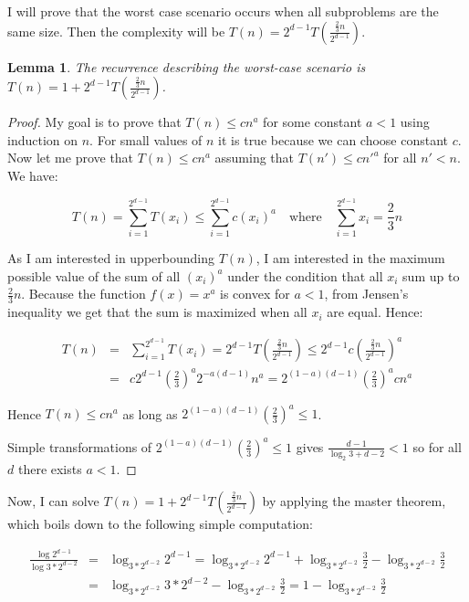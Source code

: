 \documentclass[10pt,a4paper]{article}
\newtheorem{lemma}{Lemma}
\begin{document}
I will prove that the worst case scenario occurs when all subproblems are the same size. Then the complexity will be $T(n)=2^{d-1}T(\frac{\frac{2}{3}n}{2^{d-1}})$.

\begin{lemma}\label{lem:5}
The recurrence describing the worst-case scenario is $T(n)=1+2^{d-1}T(\frac{\frac{2}{3}n}{2^{d-1}})$.
\end{lemma}

\begin{proof}

My goal is to prove that $T(n) \leq c n^a$ for some constant $a < 1$ using induction on $n$. For small values of $n$ it is true because we can choose constant $c$. Now let me prove that $T(n) \leq c n^a$ assuming that $T(n') \leq c n'^a$ for all $n'<n$. We have:

$$T(n) = \displaystyle\sum\limits_{i=1}^{2^{d-1}} T(x_i)\leq\displaystyle\sum\limits_{i=1}^{2^{d-1}} c(x_i)^{a}  \quad\text{where}\quad  \displaystyle\sum\limits_{i=1}^{2^{d-1}} x_i = \frac{2}{3}n$$ 

As I am interested in upperbounding $T(n)$, I am interested in the maximum possible value of the sum of all $(x_i)^{a}$ under the condition that all $x_{i}$ sum up to $\frac{2}{3}n$. Because the function $f(x)=x^{a}$ is convex for $a<1$, from Jensen's inequality we get that the sum is maximized when all $x_{i}$ are equal. Hence:

\begin{eqnarray*}
T(n) &=& \displaystyle\sum\limits_{i=1}^{2^{d-1}} T(x_i) = 2^{d-1} T\left(\frac{\frac{2}{3}n}{2^{d-1}}\right) \leq 2^{d-1} c \left(\frac{\frac{2}{3}n}{2^{d-1}}\right) ^ a  \\
& = & c 2^{d-1} \left(\frac{2}{3}\right)^a 2^{-a(d-1)} n^a = 2^{(1-a)(d-1)} \left(\frac{2}{3}\right)^a c n^a
\end{eqnarray*}

Hence $T(n)\leq c n^{a}$ as long as $2^{(1-a)(d-1)} (\frac{2}{3})^a \leq 1$.
\bigskip


Simple transformations of $2^{(1-a)(d-1)} (\frac{2}{3})^a \leq 1$ gives $\frac{d-1}{\log_2{3} + d - 2} < 1$ so for all $d$ there exists $a < 1$.

\end{proof}

Now, I can solve $T(n)=1+2^{d-1}T(\frac{\frac{2}{3}n}{2^{d-1}})$ by applying the master theorem, which boils down to the following simple computation:

\begin{eqnarray*}
\frac{\log 2^{d-1}}{\log 3*2^{d-2}} &=& \log_{3*2^{d-2}}{2^{d-1}} = \log_{3*2^{d-2}}{2^{d-1}} + \log_{3*2^{d-2}}{\frac{3}{2}} - \log_{3*2^{d-2}}{\frac{3}{2}}\\ 
&=& \log_{3*2^{d-2}}{3*2^{d-2}} - \log_{3*2^{d-2}}{\frac{3}{2}} = 1 - \log_{3*2^{d-2}}{\frac{3}{2}}
\end{eqnarray*}
\end{document}
